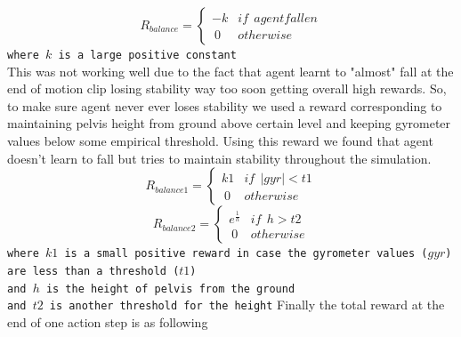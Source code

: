 $$R_{balance} =
    \begin{cases*}
      -k & if \ \ agent fallen \\ 
       \ 0  & otherwise
    \end{cases*}
$$
\texttt{where $k$ is a large positive constant}
\vspace{1em}
\\
This was not working well due to the fact that agent learnt to "almost" fall at the end of motion clip losing stability way too soon getting overall high rewards. So, to make sure agent never ever loses stability we used  a reward corresponding to maintaining pelvis height from ground above certain level and keeping gyrometer values below some empirical threshold. Using this reward we found that agent doesn't learn to fall but tries to maintain stability throughout the simulation.
$$R_{balance1} =
    \begin{cases*}
        k1 & if \ \ |gyr| < t1 \\ 
       \ 0  & otherwise
    \end{cases*}
$$
$$R_{balance2} =
    \begin{cases*}
        e^{\frac{1}{h}} & if \ \ h > t2 \\ 
       \ 0  & otherwise
    \end{cases*}
$$
\texttt{where $k1$ is a small positive reward in case the gyrometer values ($gyr$) are less than a threshold ($t1$)\\
and  $h$ is the height of pelvis from the ground \\
and $t2$ is another threshold for the height}
\newpage
Finally the total reward at the end of one action step is as following

